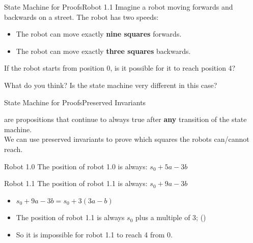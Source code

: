 \begin{frame}[t]{State Machine for Proofs}{Robot 1.1}
  Imagine a robot moving forwards and backwards on a street. The robot has two speeds:
  \begin{itemize}
    \item The robot can move exactly {\bf nine squares} forwards.
    \item The robot can move exactly {\bf three squares} backwards.
  \end{itemize}
  \bigskip

  If the robot starts from position 0, is it possible for it to reach position 4?
  \vfill

  What do you think? Is the state machine very different in this case?

\end{frame}

\begin{frame}[t]{State Machine for Proofs}{Preserved Invariants}

   are propositions that continue to always true after {\bf any} transition of the state machine.\\
  We can use preserved invariants to prove which squares the robots can/cannot reach.

  \begin{block}{Robot 1.0}
    The position of robot 1.0 is always: $s_0 + 5a - 3b$
  \end{block}
  \begin{block}{Robot 1.1}
    The position of robot 1.1 is always: $s_0 + 9a - 3b$
    \begin{itemize}
      \item $s_0 + 9a - 3b = s_0 + 3(3a-b)$
      \item The position of robot 1.1 is always $s_0$ plus a multiple of 3; ()
      \item So it is impossible for robot 1.1 to reach 4 from 0.
    \end{itemize}
  \end{block}
\end{frame}


